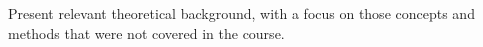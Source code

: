 Present relevant theoretical background, with a focus on those concepts
and methods that were not covered in the course.